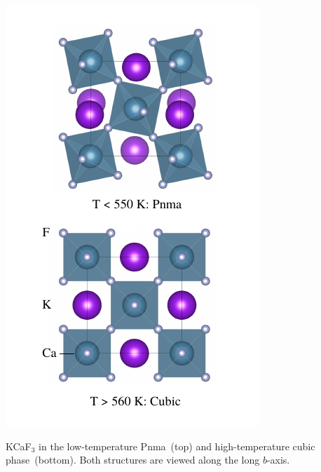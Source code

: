 \begin{marginfigure}
	\includegraphics[width=\textwidth]{./data/plots/anharmonicity/2_materials/both.pdf}
	\caption{
		KCaF$_3$ in the low-temperature Pnma~(top) and high-temperature cubic phase~(bottom). Both structures are viewed along the long $b$-axis.
	}
	\label{fig:anh.KCaF3}
\end{marginfigure}


